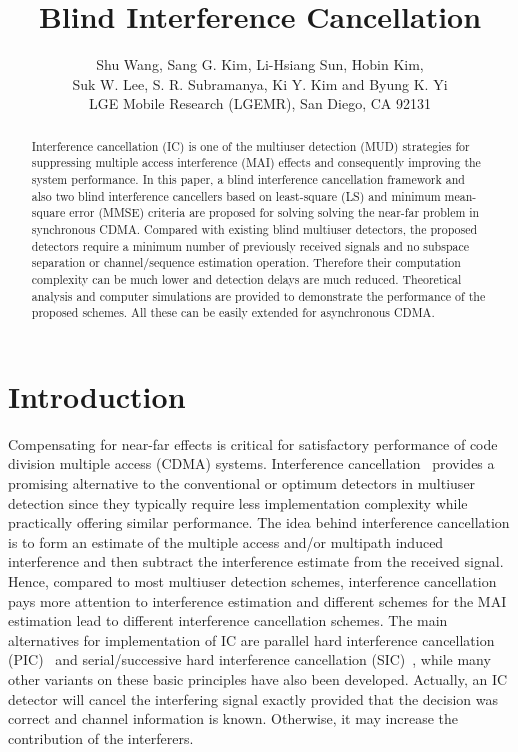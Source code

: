 \documentclass[a4paper,10pt,fleqn, twocolumn]{IEEETran}
\title{Blind Interference Cancellation}
\author{Shu Wang, Sang G. Kim, Li-Hsiang Sun, Hobin Kim,\\
   Suk W. Lee, S. R. Subramanya, Ki Y. Kim and Byung K. Yi\\ LGE Mobile Research (LGEMR), San Diego, CA 92131}
\date{}
\begin{document}
\maketitle
\begin{abstract}\small
Interference cancellation (IC) is one of the multiuser detection
(MUD) strategies for suppressing multiple access interference
(MAI) effects and consequently improving the system performance.
In this paper, a blind interference cancellation framework and
also two blind interference cancellers based on least-square (LS)
and minimum mean-square error (MMSE) criteria are proposed for
solving solving the near-far problem in synchronous CDMA. Compared
with existing blind multiuser detectors, the proposed detectors
require a minimum number of previously received signals and no
subspace separation or channel/sequence estimation operation.
Therefore their computation complexity can be much lower and
detection delays are much reduced. Theoretical analysis and
computer simulations are provided to demonstrate the performance
of the proposed schemes. All these can be easily extended for
asynchronous CDMA.
\end{abstract}
\section{Introduction}
Compensating for near-far effects is critical for satisfactory
performance of code division multiple access (CDMA) systems.
Interference
cancellation~\cite{Yoon93,Patel94,Wijk95,Divsalar96,Kim98,Bugallo01}
provides a promising alternative to the conventional or optimum
detectors in multiuser detection since they typically require less
implementation complexity while practically offering similar
performance. The idea behind interference cancellation is to form
an estimate of the multiple access and/or multipath induced
interference and then subtract the interference estimate from the
received signal. Hence, compared to most multiuser detection
schemes, interference cancellation pays more attention to
interference estimation and different schemes for the MAI
estimation lead to different interference cancellation schemes.
The main alternatives for implementation of IC are parallel hard
interference cancellation (PIC)~\cite{Divsalar96,Kim98} and
serial/successive hard interference cancellation
(SIC)~\cite{Patel94,Wijk95}, while many other variants on these
basic principles have also been developed. Actually, an IC
detector will cancel the interfering signal exactly provided that
the decision was correct and channel information is known.
Otherwise, it may increase the contribution of the interferers.
\end{document}
